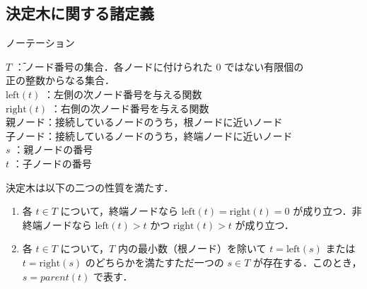 \documentclass[dvipdfmx]{jreport}
\begin{document}
\subsection{決定木に関する諸定義}
\begin{itembox}[l]{\large{ノーテーション}}
    \begin{tabbing}
        \hspace{15pt} \raisebox{0.5ex}{\tiny $\bullet$} $T$ \hspace{28pt} \=：ノード番号の集合．各ノードに付けられた 0 ではない有限個の\\[0.5em]\>\hspace{6.5pt}正の整数からなる集合．\\[0.5em]
        \hspace{15pt} \raisebox{0.5ex}{\tiny $\bullet$} $\text{left}(t)$ \>：左側の次ノード番号を与える関数 \\[0.5em]
        \hspace{15pt} \raisebox{0.5ex}{\tiny $\bullet$} $\text{right}(t)$ \>：右側の次ノード番号を与える関数\\[0.5em]
        \hspace{15pt} \raisebox{0.5ex}{\tiny $\bullet$} 親ノード\>：接続しているノードのうち，根ノードに近いノード\\[0.5em]
        \hspace{15pt} \raisebox{0.5ex}{\tiny $\bullet$} 子ノード\>：接続しているノードのうち，終端ノードに近いノード\\[0.5em]
        \hspace{15pt} \raisebox{0.5ex}{\tiny $\bullet$} $s$ \>：親ノードの番号\\[0.5em]
        \hspace{15pt} \raisebox{0.5ex}{\tiny $\bullet$} $t$ \>：子ノードの番号
    \end{tabbing}
\end{itembox}

\indent{}
決定木は以下の二つの性質を満たす．
\begin{tcolorbox}[title=\textbf{木が満たす性質}]
    \begin{enumerate}
        \item 各 $t \in T$ について，終端ノードなら $\text{left}(t) = \text{right}(t) = 0$ が成り立つ．非終端ノードなら $\text{left}(t) > t$ かつ $\text{right}(t) > t$ が成り立つ．
        \item 各 $t \in T$ について，$T$ 内の最小数（根ノード）を除いて $t = \text{left}(s)$ または $t = \text{right}(s)$ のどちらかを満たすただ一つの $s \in T$ が存在する．このとき，$s = parent(t)$ で表す．
    \end{enumerate}
\end{tcolorbox}
\end{document}
